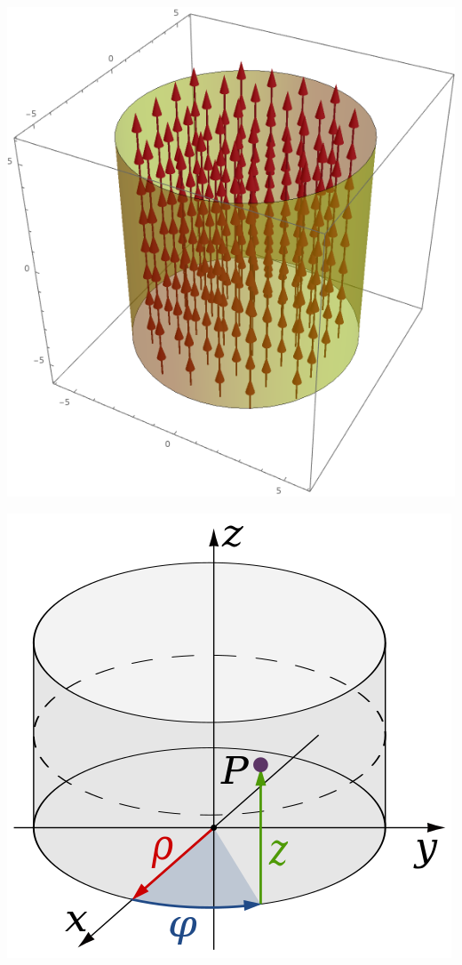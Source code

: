 					\formulaEnd
					\begin{center}

					\includegraphics[scale=0.4]{zylindric_z.png}

					\end{center}



					 {}
					\beginip

					\includegraphics[scale = 0.4]{zylinderkoord.png}
					\iend


